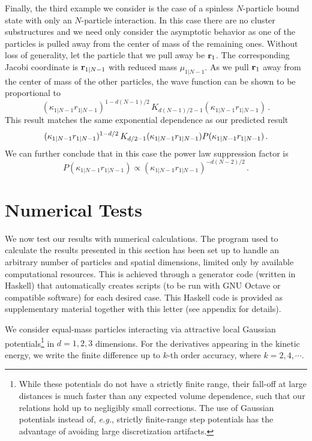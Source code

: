 \documentclass[aps,singlecolumn,superscriptaddress,nofootinbib,tightenlines,
preprintnumbers,showkeys]{revtex4-1}
\newcommand{\eg}{\textit{e.g.}}
\begin{document}
\medskip
Finally, the third example we consider is the case of a spinless $N$-particle 
bound state with only an $N$-particle interaction.  In this case there are no 
cluster substructures and we need only consider the asymptotic behavior as one 
of the particles is pulled away from the center of mass of the remaining 
ones.  Without loss of generality, let the particle that we pull away be ${\bf 
r}_1$.  The corresponding Jacobi coordinate is ${\bf r}_{1|N-1}$ with reduced 
mass $\mu_{1|N-1}$.  As we pull ${\bf r}_1$ away from the center of mass of the 
other particles, the wave function can be shown to be proportional to
%
\begin{equation}
 (\kappa_{1|N-1}r_{1|N-1})^{1-d(N-1)/2} \,
 K_{d(N-1)/2-1}(\kappa_{1|N-1}r_{1|N-1}) \,.
\end{equation}
%
This result matches the same exponential dependence as our predicted result
%
\begin{equation}
 (\kappa_{1|N-1}r_{1|N-1})^{1-d/2} \, K_{d/2-1}(\kappa_{1|N-1}r_{1|N-1})
 \null  P(\kappa_{1|N-1}r_{1|N-1}) \,.
\end{equation}
%
We can further conclude that in this case the power law suppression factor is
%
\begin{equation}
 P(\kappa_{1|N-1}r_{1|N-1}) \propto (\kappa_{1|N-1}r_{1|N-1})^{-d(N-2)/2}
\,.
\end{equation}

\section{Numerical Tests}

We now test our results with numerical calculations.  The program used to 
calculate the results presented in this section has been set up to handle an 
arbitrary number of particles and spatial dimensions, limited only by available 
computational resources.  This is achieved through a generator code (written in 
Haskell) that automatically creates scripts (to be run with GNU Octave or 
compatible software) for each desired case.  This Haskell code is provided as 
supplementary material together with this letter (see appendix for details).

We consider equal-mass particles interacting via attractive local Gaussian 
potentials\footnote{While these potentials do not have a strictly finite range, 
their fall-off at large distances is much faster than any expected volume 
dependence, such that our relations hold up to negligibly small corrections.  
The use of Gaussian potentials instead of, \eg, strictly finite-range step 
potentials has the advantage of avoiding large discretization artifacts.} in 
$d=1,2,3$ dimensions.  For the derivatives appearing in the kinetic energy, we 
write the finite difference up to $k$-th order accuracy, where $k=2,4,\cdots$.
\end{document}
